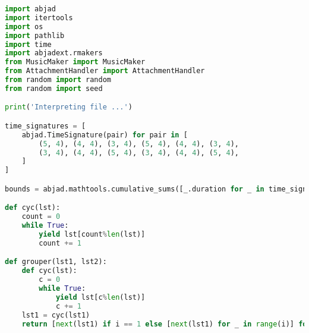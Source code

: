 \begin{lstlisting}[language=Python, caption=Invocation Source Code]
import abjad
import itertools
import os
import pathlib
import time
import abjadext.rmakers
from MusicMaker import MusicMaker
from AttachmentHandler import AttachmentHandler
from random import random
from random import seed

print('Interpreting file ...')

time_signatures = [
    abjad.TimeSignature(pair) for pair in [
        (5, 4), (4, 4), (3, 4), (5, 4), (4, 4), (3, 4),
        (3, 4), (4, 4), (5, 4), (3, 4), (4, 4), (5, 4),
    ]
]

bounds = abjad.mathtools.cumulative_sums([_.duration for _ in time_signatures])

def cyc(lst):
    count = 0
    while True:
        yield lst[count%len(lst)]
        count += 1

def grouper(lst1, lst2):
    def cyc(lst):
        c = 0
        while True:
            yield lst[c%len(lst)]
            c += 1
    lst1 = cyc(lst1)
    return [next(lst1) if i == 1 else [next(lst1) for _ in range(i)] for i in lst2]


\end{lstlisting}
